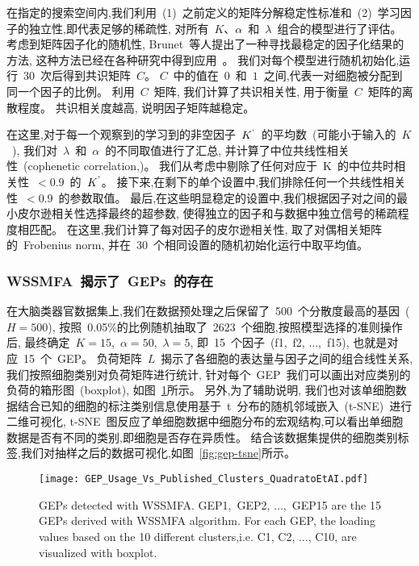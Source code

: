 在指定的搜索空间内,我们利用~(1)~之前定义的矩阵分解稳定性标准和~(2)~学习因子的独立性,即代表足够的稀疏性,
对所有~$K$、$\alpha$~和~$\lambda$~组合的模型进行了评估。
考虑到矩阵因子化的随机性, Brunet~等人提出了一种寻找最稳定的因子化结果的方法,
这种方法已经在各种研究中得到应用~\cite{brunet2004metagenes,wu2016stability}。
我们对每个模型进行随机初始化,运行~30~次后得到共识矩阵~$C$。
$C$~中的值在~$0$~和~$1$~之间,代表一对细胞被分配到同一个因子的比例。
利用~$C$~矩阵, 我们计算了共识相关性, 用于衡量~$C$~矩阵的离散程度。
共识相关度越高, 说明因子矩阵越稳定。

在这里,对于每一个观察到的学习到的非空因子~$K^\textup{'}$~的平均数~(可能小于输入的~$K$~),
我们对~$\lambda$~和~$\alpha$~的不同取值进行了汇总,
并计算了中位共线性相关性~(cophenetic correlation,\cite{brunet2004metagenes})。
我们从考虑中剔除了任何对应于~K~的中位共时相关性~$< 0.9$~的~$K^\textup{'}$。
接下来,在剩下的单个设置中,我们排除任何一个共线性相关性~$< 0.9$~的参数取值。
最后,在这些明显稳定的设置中,我们根据因子对之间的最小皮尔逊相关性选择最终的超参数,
使得独立的因子和与数据中独立信号的稀疏程度相匹配。
在这里,我们计算了每对因子的皮尔逊相关性, 取了对偶相关矩阵的~Frobenius norm, 
并在~30~个相同设置的随机初始化运行中取平均值。

\subsubsection{WSSMFA~揭示了~GEPs~的存在}
在大脑类器官数据集上,我们在数据预处理之后保留了~500~个分散度最高的基因~($H = 500$),
按照~0.05\%的比例随机抽取了~2623~个细胞,按照模型选择的准则操作后,
最终确定~$K = 15$,~$\alpha = 50$,~$\lambda = 5$, 
即~15~个因子~(f1,~f2, $\ldots$,~f15), 也就是对应~15~个~GEP。
负荷矩阵~$L$~揭示了各细胞的表达量与因子之间的组合线性关系, 我们按照细胞类别对负荷矩阵进行统计,
针对每个~GEP~我们可以画出对应类别的负荷的箱形图~(boxplot), 如图~\ref{fig:gep-gep}所示。
另外,为了辅助说明, 我们也对该单细胞数据结合已知的细胞的标注类别信息使用基于~t~分布的随机邻域嵌入~(t-SNE)~进行二维可视化,
t-SNE~图反应了单细胞数据中细胞分布的宏观结构,可以看出单细胞数据是否有不同的类别,即细胞是否存在异质性。
结合该数据集提供的细胞类别标签,我们对抽样之后的数据可视化,如图~\ref{fig:gep-tsne}所示。

\begin{figure}[!htbp]
    \centering
    \texttt{[image: GEP\_Usage\_Vs\_Published\_Clusters\_QuadratoEtAI.pdf]}
    \caption{GEPs detected with WSSMFA.
    GEP1,~GEP2, $\ldots$,~GEP15 are the 15 GEPs derived with WSSMFA algorithm.
    For each GEP, the loading values based on the 10 different clusters,i.e. C1, C2, $\ldots$, C10,  are visualized with boxplot.
    }
    \label{fig:gep-gep}
\end{figure}


